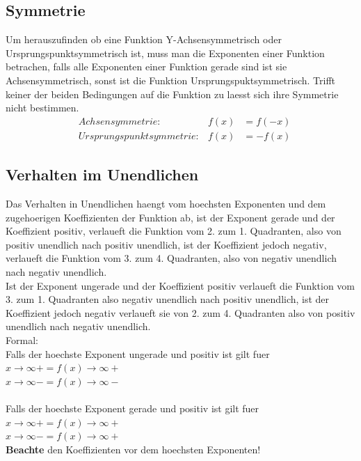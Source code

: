 \documentclass[a4paper]{article} %
\begin{document}
	\subsection{Symmetrie}
	Um herauszufinden ob eine Funktion Y-Achsensymmetrisch oder Ursprungspunktsymmetrisch ist, muss man die Exponenten einer Funktion betrachen, falls alle Exponenten einer Funktion gerade sind ist sie Achsensymmetrisch, sonst ist die Funktion Ursprungspuktsymmetrisch. Trifft keiner der beiden Bedingungen auf die Funktion zu laesst sich ihre Symmetrie nicht bestimmen.
	\begin{align*}
	& Achsensymmetrie:  & f(x)&=f(-x)\\
		& Ursprungspunktsymmetrie:  & f(x)&=-f(x)
	\end{align*}
	\subsection{Verhalten im Unendlichen}
	Das Verhalten in Unendlichen haengt vom hoechsten Exponenten und dem zugehoerigen Koeffizienten der Funktion ab, ist der Exponent gerade und der Koeffizient positiv, verlaueft die Funktion vom 2. zum 1. Quadranten, also von positiv unendlich nach positiv unendlich, ist der Koeffizient jedoch negativ, verlaueft die Funktion vom 3. zum 4. Quadranten, also von negativ unendlich nach negativ unendlich.\\
	Ist der Exponent ungerade und der Koeffizient positiv verlaueft die Funktion vom 3. zum 1. Quadranten also negativ unendlich nach positiv unendlich, ist der Koeffizient jedoch negativ verlaueft sie von 2. zum 4. Quadranten also von positiv unendlich nach negativ unendlich.\\
	Formal: \\
	Falls der hoechste Exponent ungerade und positiv ist gilt fuer $x\rightarrow\infty+ = f(x)\rightarrow\infty+$\\
	\hspace*{8.9cm} 	$x\rightarrow\infty- = f(x)\rightarrow\infty-$\\\\
	Falls der hoechste Exponent gerade und positiv ist gilt fuer $x\rightarrow\infty+ = f(x)\rightarrow\infty+$\\
	\hspace*{8.5cm} 	$x\rightarrow\infty- = f(x)\rightarrow\infty+$\\
	\textbf{Beachte} den Koeffizienten vor dem hoechsten Exponenten!
	
\end{document}
